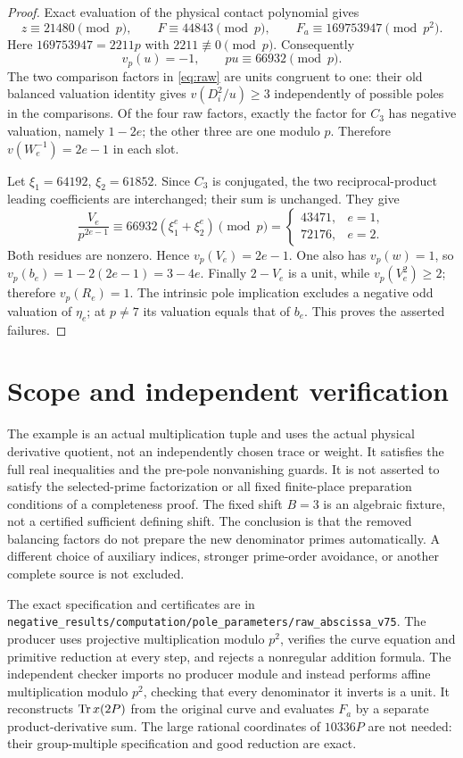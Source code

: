 \documentclass[11pt,a4paper]{article}
\begin{document}
\begin{proof}
Exact evaluation of the physical contact polynomial gives
\[
 z\equiv21480\pmod p,\qquad F\equiv44843\pmod p,
 \qquad F_a\equiv169753947\pmod {p^2}.
\]
Here $169753947=2211p$ with $2211\not\equiv0\pmod p$.
Consequently
\[
                  v_p(u)=-1,\qquad pu\equiv66932\pmod p.
\]
The two comparison factors in \eqref{eq:raw} are units congruent
to one: their old balanced valuation identity gives
$v(D_i^2/u)\ge3$ independently of possible poles in the comparisons.
Of the four raw factors, exactly the factor for $C_3$ has negative
valuation, namely $1-2e$; the other three are one modulo $p$.
Therefore $v(W_e^{-1})=2e-1$ in each slot.

Let $\xi_1=64192$, $\xi_2=61852$. Since $C_3$ is conjugated,
the two reciprocal-product leading coefficients are interchanged;
their sum is unchanged. They give
\[
 \frac{V_e}{p^{2e-1}}
       \equiv66932(\xi_1^e+\xi_2^e)\pmod p
       =\begin{cases}43471,&e=1,\\72176,&e=2.\end{cases}
\]
Both residues are nonzero. Hence $v_p(V_e)=2e-1$.
One also has $v_p(w)=1$, so
$v_p(b_e)=1-2(2e-1)=3-4e$.
Finally $2-V_e$ is a unit, while $v_p(V_e^2)\ge2$;
therefore $v_p(R_e)=1$.
The intrinsic pole implication excludes a negative odd valuation of
$\eta_e$; at $p\ne7$ its valuation equals that of $b_e$.
This proves the asserted failures.
\end{proof}

\section*{Scope and independent verification}
The example is an actual multiplication tuple and uses the actual
physical derivative quotient, not an independently chosen trace or
weight. It satisfies the full real inequalities and the pre-pole
nonvanishing guards. It is not asserted to satisfy the selected-prime
factorization or all fixed finite-place preparation conditions of a
completeness proof. The fixed shift $B=3$ is an algebraic fixture, not
a certified sufficient defining shift. The conclusion is that the
removed balancing factors do not prepare the new denominator primes
automatically. A different choice of auxiliary indices, stronger
prime-order avoidance, or another complete source is not excluded.

The exact specification and certificates are in
\nolinkurl{negative_results/computation/pole_parameters/raw_abscissa_v75}.
The producer uses projective multiplication modulo $p^2$, verifies the
curve equation and primitive reduction at every step, and rejects a
nonregular addition formula. The independent checker imports no
producer module and instead performs affine multiplication modulo $p^2$,
checking that every denominator it inverts is a unit. It reconstructs
$\operatorname{Tr} x(2P)$ from the original curve and evaluates $F_a$ by a separate
product-derivative sum. The large rational coordinates of $10336P$
are not needed: their group-multiple specification and good reduction
are exact.
\end{document}
